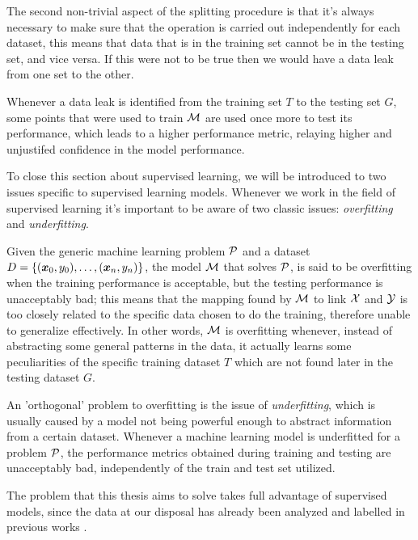 \medskip

The second non-trivial aspect of the splitting procedure is that it's always necessary to make sure
that the operation is carried out independently for each dataset, this means that data that is in the
training set cannot be in the testing set, and vice versa. If this were not to be true then we would
have a data leak from one set to the other.

\smallskip

Whenever a data leak is identified from the training set $T$ to the testing set $G$, some points
that were used to train $\mathcal{M}$ are used once more to test its performance, which leads to a higher
performance metric, relaying higher and unjustifed confidence in the model performance.

\medskip

To close this section about supervised learning, we will be introduced to two issues specific to
supervised learning models. Whenever we work in the field of supervised learning it's important to be aware of two classic issues: \emph{overfitting} and \emph{underfitting}.

\smallskip

Given the generic machine learning problem $\mathcal{P}$ and a dataset $D = \{(\boldsymbol{x}_0, y_0), \ldots, (\boldsymbol{x}_n, y_n)\}$, the model $\mathcal{M}$ that
solves $\mathcal{P}$, is said to be overfitting when the training performance is acceptable, but the
testing performance is unacceptably bad; this means that the mapping found by $\mathcal{M}$ to link $\mathcal{X}$
and $\mathcal{Y}$ is too closely related to the specific data chosen to do the training, therefore
unable to generalize effectively. In other
words, $\mathcal{M}$ is overfitting whenever, instead of abstracting some general patterns in the
data, it actually learns some peculiarities of the specific training dataset $T$ \cite{ZhouZhi-Hua2021ML}
which are not found later in the testing dataset $G$.

\smallskip

An 'orthogonal' problem to overfitting is the issue of \emph{underfitting}, which is usually caused
by a model not being powerful enough to abstract information from a certain dataset. Whenever a
machine learning model is underfitted for a problem $\mathcal{P}$, the performance metrics obtained
during training and testing are unacceptably bad, independently of the train and test set
utilized.

\medskip

The problem that this thesis aims to solve takes full advantage of supervised models, since the data at our
disposal has already been analyzed and labelled in previous works \cite{mariotto2022}\cite{mariotto2022-generic}.

